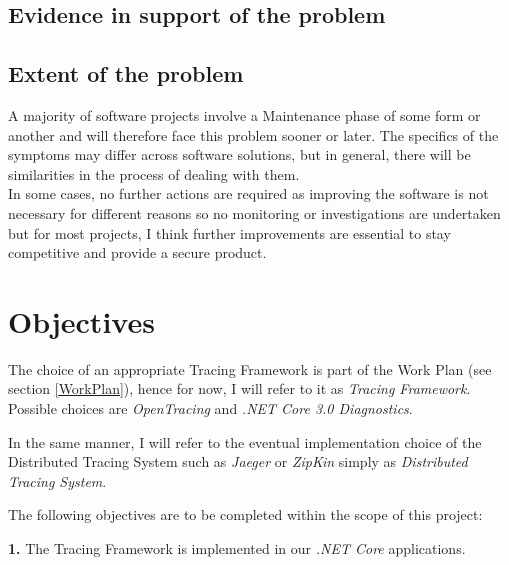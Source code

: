 \documentclass[11pt]{article}
\begin{document}
\subsection{Evidence in support of the problem}


\subsection{Extent of the problem}

A majority of software projects involve a Maintenance phase of some form or another and will therefore face this problem sooner or later. The specifics of the symptoms may differ across software solutions, but in general, there will be similarities in the process of dealing with them.\\
In some cases, no further actions are required as improving the software is not necessary for different reasons so no monitoring or investigations are undertaken but for most projects, I think further improvements are essential to stay competitive and provide a secure product.

\section{Objectives} 


The choice of an appropriate Tracing Framework is part of the Work Plan (see section \ref{WorkPlan}), hence for now, I will refer to it as \textit{Tracing Framework}. Possible choices are \textit{OpenTracing} and \textit{.NET Core 3.0 Diagnostics}.

In the same manner, I will refer to the eventual implementation choice of the Distributed Tracing System such as \textit{Jaeger} or \textit{ZipKin} simply as \textit{Distributed Tracing System}.

The following objectives are to be completed within the scope of this project:

\textbf{1.} The Tracing Framework is implemented in our \textit{.NET Core} applications.

\end{document}

